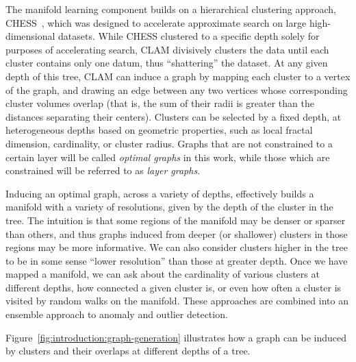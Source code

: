 The manifold learning component builds on a hierarchical clustering approach, CHESS~\cite{ishaq2019clustered}, which was designed to accelerate approximate search on large high-dimensional datasets.
While CHESS clustered to a specific depth solely for purposes of accelerating search, CLAM
divisively clusters the data until each cluster contains only one datum, thus ``shattering'' the dataset.
At any given depth of this tree, CLAM can induce a graph by mapping each cluster to a vertex of the graph, and drawing an edge between any two vertices whose corresponding cluster volumes overlap (that is, the sum of their radii is greater than the distances separating their centers).
Clusters can be selected by a fixed depth, at heterogeneous depths based on geometric properties, such as local fractal dimension, cardinality, or cluster radius.
Graphs that are not constrained to a certain layer will be called \textit{optimal graphs} in this work, while those which are constrained will be referred to as \textit{layer graphs}.

Inducing an optimal graph, across a variety of depths, effectively builds a manifold with a variety of resolutions, given by the depth of the cluster in the tree. The intuition is that some regions of the manifold may be denser or sparser than others, and thus graphs induced from deeper (or shallower) clusters in those regions may be more informative.
We can also consider clusters higher in the tree to be in some sense ``lower resolution'' than those at greater depth.
Once we have mapped a manifold, we can ask about the cardinality of various clusters at different depths, how connected a given cluster is, or even how often a cluster is visited by random walks on the manifold.
These approaches are combined into an ensemble approach to anomaly and outlier detection.

Figure~\ref{fig:introduction:graph-generation} illustrates how a graph can be induced by clusters and their overlaps at different depths of a tree.

